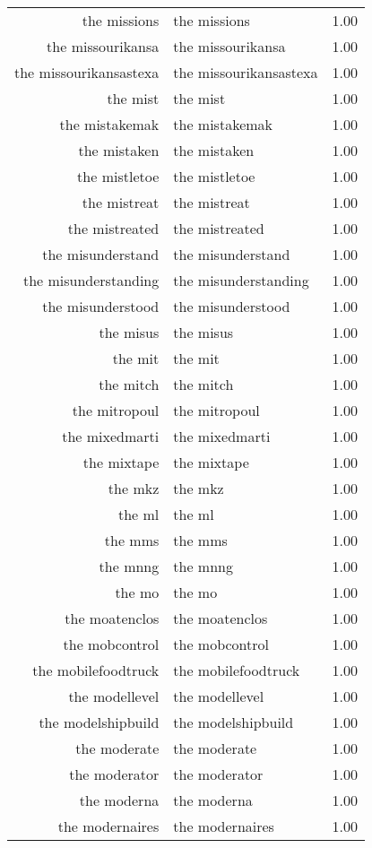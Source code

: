 \begin{table}[ht]
\begin{tabular}{rlr}
  the missions & the missions & 1.00 \\ 
  the missourikansa & the missourikansa & 1.00 \\ 
  the missourikansastexa & the missourikansastexa & 1.00 \\ 
  the mist & the mist & 1.00 \\ 
  the mistakemak & the mistakemak & 1.00 \\ 
  the mistaken & the mistaken & 1.00 \\ 
  the mistletoe & the mistletoe & 1.00 \\ 
  the mistreat & the mistreat & 1.00 \\ 
  the mistreated & the mistreated & 1.00 \\ 
  the misunderstand & the misunderstand & 1.00 \\ 
  the misunderstanding & the misunderstanding & 1.00 \\ 
  the misunderstood & the misunderstood & 1.00 \\ 
  the misus & the misus & 1.00 \\ 
  the mit & the mit & 1.00 \\ 
  the mitch & the mitch & 1.00 \\ 
  the mitropoul & the mitropoul & 1.00 \\ 
  the mixedmarti & the mixedmarti & 1.00 \\ 
  the mixtape & the mixtape & 1.00 \\ 
  the mkz & the mkz & 1.00 \\ 
  the ml & the ml & 1.00 \\ 
  the mms & the mms & 1.00 \\ 
  the mnng & the mnng & 1.00 \\ 
  the mo & the mo & 1.00 \\ 
  the moatenclos & the moatenclos & 1.00 \\ 
  the mobcontrol & the mobcontrol & 1.00 \\ 
  the mobilefoodtruck & the mobilefoodtruck & 1.00 \\ 
  the modellevel & the modellevel & 1.00 \\ 
  the modelshipbuild & the modelshipbuild & 1.00 \\ 
  the moderate & the moderate & 1.00 \\ 
  the moderator & the moderator & 1.00 \\ 
  the moderna & the moderna & 1.00 \\ 
  the modernaires & the modernaires & 1.00 \\ 

\end{tabular}
\end{table}
